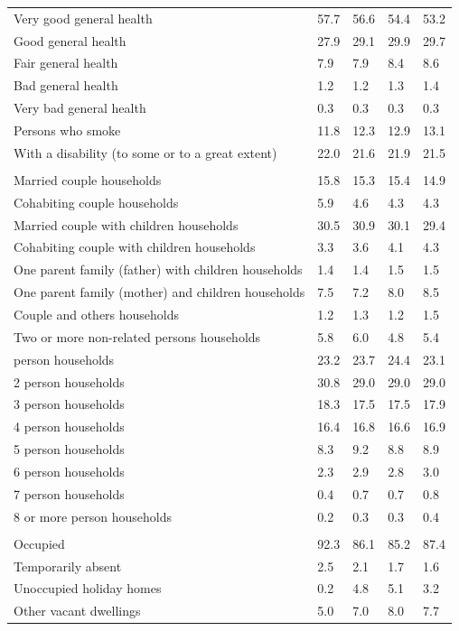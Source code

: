\documentclass{article}
\begin{document}
\begin{table}[h]
\begin{tabular}{KTTTT}
    \hline
Very good general health & 57.7& 56.6&54.4& 53.2\\
Good general health & 27.9& 29.1& 29.9& 29.7\\
Fair general health & 7.9& 7.9&8.4& 8.6\\
Bad general health & 1.2& 1.2&1.3& 1.4\\
Very bad general health & 0.3& 0.3&0.3& 0.3\\
    \hline
Persons who smoke & 11.8& 12.3&12.9& 13.1\\
    \hline
With a disability (to some or to a great extent) & 22.0& 21.6&21.9& 21.5\\
\hline
    \\ 
    \hline
Married couple households & 15.8& 15.3& 15.4& 14.9\\
Cohabiting couple households & 5.9& 4.6& 4.3& 4.3\\
Married couple with children households & 30.5& 30.9& 30.1& 29.4\\
Cohabiting couple with children households & 3.3& 3.6& 4.1& 4.3\\
One parent family (father) with  children households & 1.4& 1.4& 1.5& 1.5\\
One parent family (mother) and children households & 7.5& 7.2& 8.0& 8.5\\
Couple and others households  & 1.2& 1.3& 1.2& 1.5\\
Two or more non-related persons households & 5.8& 6.0& 4.8& 5.4\\
     person households & 23.2& 23.7& 24.4& 23.1\\
2 person households & 30.8& 29.0& 29.0& 29.0\\
3 person households & 18.3& 17.5& 17.5& 17.9\\
4 person households & 16.4& 16.8& 16.6& 16.9\\
5 person households & 8.3& 9.2& 8.8& 8.9\\
6 person households & 2.3& 2.9& 2.8& 3.0\\
7 person households & 0.4& 0.7& 0.7& 0.8\\
8 or more person households & 0.2& 0.3& 0.3& 0.4\\
\hline
    \\ 
    \hline
Occupied & 92.3& 86.1& 85.2& 87.4\\
Temporarily absent & 2.5& 2.1& 1.7& 1.6\\
Unoccupied holiday homes & 0.2& 4.8& 5.1& 3.2\\
Other vacant dwellings & 5.0& 7.0& 8.0& 7.7\\
\hline
\end{tabular}
\end{table}
\end{document}
